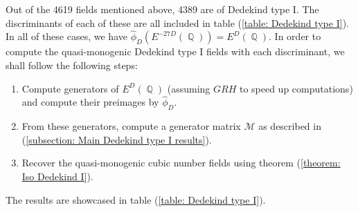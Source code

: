 \documentclass[oneside]{amsart}
\DeclareMathOperator{\QQ}{\mathbb{Q}}
\theoremstyle{definition}
\begin{document}
Out of the 4619 fields mentioned above, 4389 are of Dedekind type I. The discriminants of each of these are all included in table (\ref{table: Dedekind type I}). In all of these cases, we have $\hat{\phi}_D(E^{-27D}(\QQ)) = E^D(\QQ)$. In order to compute the quasi-monogenic Dedekind type I fields with each discriminant, we shall follow the following steps: 
\begin{enumerate}
    \item Compute generators of $E^{D}(\QQ)$ (assuming $GRH$ to speed up computations) and compute their preimages by $\hat{\phi}_D$.
    \item From these generators, compute a generator matrix $\mathcal{M}$ as described in (\ref{subsection: Main Dedekind type I results}).
    \item Recover the quasi-monogenic cubic number fields using theorem (\ref{theorem: Iso Dedekind I}).
\end{enumerate}
The results are showcased in table (\ref{table: Dedekind type I}).
\newpage
\end{document}
